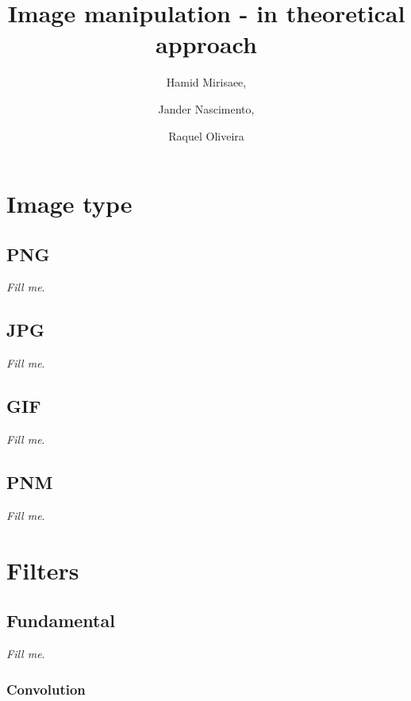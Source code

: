 \documentclass{report}
\begin{document}
\title{Image manipulation - in theoretical approach}

\author{Hamid Mirisaee,
\and Jander Nascimento, 
\and Raquel Oliveira}

\maketitle

\tableofcontents

\vfill

\section{Image type}

	\subsection{PNG}

		\textit{Fill me}.

	\subsection{JPG}

		\textit{Fill me}.

	\subsection{GIF}

		\textit{Fill me}.

	\subsection{PNM}

		\textit{Fill me}.

\section{Filters}

	\subsection{Fundamental}

		\textit{Fill me}.

		\subsubsection{Convolution}
\end{document}
